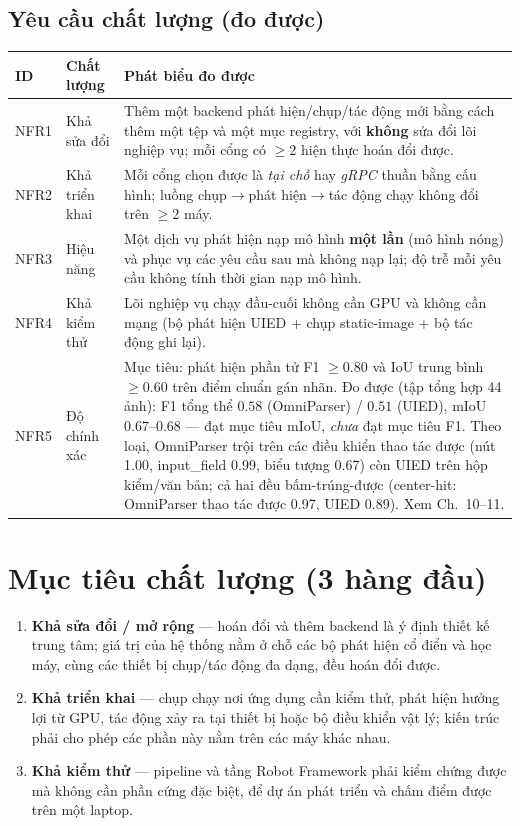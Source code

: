 \documentclass[11pt,a4paper]{report}
\newcommand{\req}[1]{\textbf{#1}}
\begin{document}
\subsection*{Yêu cầu chất lượng (đo được)}
\begin{longtable}{@{}p{1.6cm}p{4.0cm}p{8.6cm}@{}}
\toprule
\textbf{ID} & \textbf{Chất lượng} & \textbf{Phát biểu đo được} \\
\midrule
\endhead
NFR1 & Khả sửa đổi & Thêm một backend phát hiện/chụp/tác động mới bằng cách thêm một tệp và một mục registry, với \textbf{không} sửa đổi lõi nghiệp vụ; mỗi cổng có $\geq 2$ hiện thực hoán đổi được. \\
NFR2 & Khả triển khai & Mỗi cổng chọn được là \emph{tại chỗ} hay \emph{gRPC} thuần bằng cấu hình; luồng chụp$\rightarrow$phát hiện$\rightarrow$tác động chạy không đổi trên $\geq 2$ máy. \\
NFR3 & Hiệu năng & Một dịch vụ phát hiện nạp mô hình \textbf{một lần} (mô hình nóng) và phục vụ các yêu cầu sau mà không nạp lại; độ trễ mỗi yêu cầu không tính thời gian nạp mô hình. \\
NFR4 & Khả kiểm thử & Lõi nghiệp vụ chạy đầu-cuối không cần GPU và không cần mạng (bộ phát hiện UIED + chụp static-image + bộ tác động ghi lại). \\
NFR5 & Độ chính xác & Mục tiêu: phát hiện phần tử F1 $\geq 0.80$ và IoU trung bình $\geq 0.60$ trên điểm chuẩn gán nhãn. Đo được (tập tổng hợp 44 ảnh): F1 tổng thể $0.58$ (OmniParser) / $0.51$ (UIED), mIoU 0.67--0.68 --- đạt mục tiêu mIoU, \emph{chưa} đạt mục tiêu F1. Theo loại, OmniParser trội trên các điều khiển thao tác được (nút 1.00, input\_field 0.99, biểu tượng 0.67) còn UIED trên hộp kiểm/văn bản; cả hai đều bấm-trúng-được (center-hit: OmniParser thao tác được 0.97, UIED 0.89). Xem Ch.~10--11. \\
\bottomrule
\end{longtable}

\section{Mục tiêu chất lượng (3 hàng đầu)}
\begin{enumerate}[leftmargin=1.6em]
  \item \req{Khả sửa đổi / mở rộng} --- hoán đổi và thêm backend là ý định thiết kế
        trung tâm; giá trị của hệ thống nằm ở chỗ các bộ phát hiện cổ điển và học máy,
        cùng các thiết bị chụp/tác động đa dạng, đều hoán đổi được.
  \item \req{Khả triển khai} --- chụp chạy nơi ứng dụng cần kiểm thử, phát hiện hưởng
        lợi từ GPU, tác động xảy ra tại thiết bị hoặc bộ điều khiển vật lý; kiến trúc
        phải cho phép các phần này nằm trên các máy khác nhau.
  \item \req{Khả kiểm thử} --- pipeline và tầng Robot Framework phải kiểm chứng được
        mà không cần phần cứng đặc biệt, để dự án phát triển và chấm điểm được trên
        một laptop.
\end{enumerate}
\end{document}
